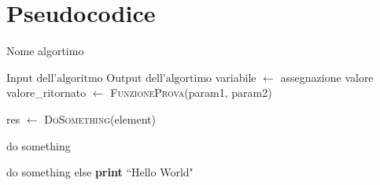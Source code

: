 \section{Pseudocodice}

\begin{algorithm}
    \caption{Nome algortimo}\label{algo:name}
    \begin{algorithmic}[1]
        \Require $\text{Input dell'algoritmo}$
        \Ensure $\text{Output dell'algortimo}$
        \State variabile $\gets$ assegnazione valore
        \State valore\_ritornato $\gets$ \textsc{Funzione}\textsc{Prova}(param1, param2)
        
        \State res $\gets$ \textsc{Do}\textsc{Something}(element)
        \EndFor
        
        \State do something
        
        \State do something else
        \Else
        \State \textbf{print} ``Hello World"
        \EndIf
    \end{algorithmic}
\end{algorithm}